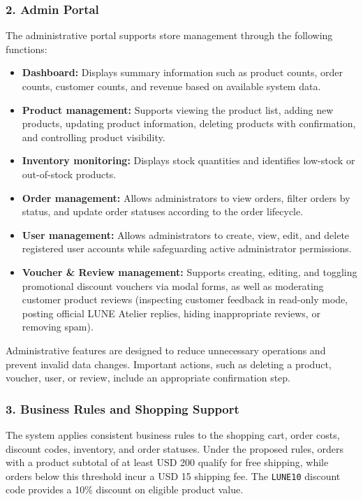 \documentclass[12pt,a4paper,oneside]{report}
\begin{document}
\subsubsection{2. Admin Portal}
The administrative portal supports store management through the following functions:
\begin{itemize}[leftmargin=1.2cm]
    \item \textbf{Dashboard:} Displays summary information such as product counts, order counts, customer counts, and revenue based on available system data.
    \item \textbf{Product management:} Supports viewing the product list, adding new products, updating product information, deleting products with confirmation, and controlling product visibility.
    \item \textbf{Inventory monitoring:} Displays stock quantities and identifies low-stock or out-of-stock products.
    \item \textbf{Order management:} Allows administrators to view orders, filter orders by status, and update order statuses according to the order lifecycle.
    \item \textbf{User management:} Allows administrators to create, view, edit, and delete registered user accounts while safeguarding active administrator permissions.
    \item \textbf{Voucher \& Review management:} Supports creating, editing, and toggling promotional discount vouchers via modal forms, as well as moderating customer product reviews (inspecting customer feedback in read-only mode, posting official LUNE Atelier replies, hiding inappropriate reviews, or removing spam).
\end{itemize}
Administrative features are designed to reduce unnecessary operations and prevent invalid data changes. Important actions, such as deleting a product, voucher, user, or review, include an appropriate confirmation step.

\subsubsection{3. Business Rules and Shopping Support}
The system applies consistent business rules to the shopping cart, order costs, discount codes, inventory, and order statuses. Under the proposed rules, orders with a product subtotal of at least USD 200 qualify for free shipping, while orders below this threshold incur a USD 15 shipping fee. The \texttt{LUNE10} discount code provides a 10\% discount on eligible product value.
\end{document}
